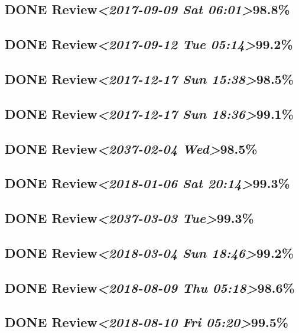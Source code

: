 \documentclass[11pt]{ctexart}
\begin{document}
\subsection{{\bfseries\sffamily DONE} Review\textit{<2017-09-09 Sat 06:01>}98.8\%}
\label{sec:org9813bcb}
\subsection{{\bfseries\sffamily DONE} Review\textit{<2017-09-12 Tue 05:14>}99.2\%}
\label{sec:org6f9505e}

\subsection{{\bfseries\sffamily DONE} Review\textit{<2017-12-17 Sun 15:38>}98.5\%}
\label{sec:orge73b500}
\subsection{{\bfseries\sffamily DONE} Review\textit{<2017-12-17 Sun 18:36>}99.1\%}
\label{sec:org43b6a72}
\subsection{{\bfseries\sffamily DONE} Review\textit{<2037-02-04 Wed>}98.5\%}
\label{sec:orgf6fac67}
\subsection{{\bfseries\sffamily DONE} Review\textit{<2018-01-06 Sat 20:14>}99.3\%}
\label{sec:org0c387cd}
\subsection{{\bfseries\sffamily DONE} Review\textit{<2037-03-03 Tue>}99.3\%}
\label{sec:org47a122e}
\subsection{{\bfseries\sffamily DONE} Review\textit{<2018-03-04 Sun 18:46>}99.2\%}
\label{sec:org2ad21b9}
\subsection{{\bfseries\sffamily DONE} Review\textit{<2018-08-09 Thu 05:18>}98.6\%}
\label{sec:orged98da3}
\subsection{{\bfseries\sffamily DONE} Review\textit{<2018-08-10 Fri 05:20>}99.5\%}
\label{sec:org97b05f5}
\end{document}
